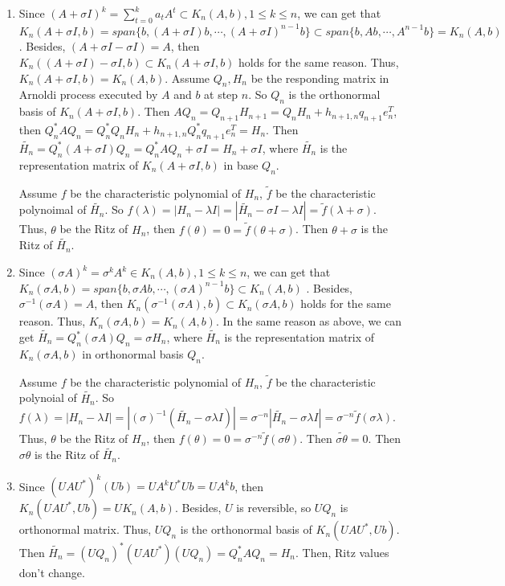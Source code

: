 \documentclass{ctexart}
\begin{document}
\begin{solution}
  \begin{enumerate}
    \item Since \((A + \sigma I)^k =\sum_{t=0}^{k} a_t A^t \subset K_n(A,b), 1 \leq k \leq n\), we can get that \(K_n(A + \sigma I,b)=span\{b,(A + \sigma I)b,\cdots,(A + \sigma I)^{n-1} b\}\subset span\{b,Ab,\cdots,A^{n -1} b\}=K_n(A,b) \).
      Besides, \((A + \sigma I - \sigma I)=A \), then \(K_n((A + \sigma I)-\sigma I, b) \subset K_n(A + \sigma I, b) \) holds for the same reason.
      Thus, \(K_n(A + \sigma I,b)=K_n(A,b) \). Assume \( Q_n, H_n\) be the responding matrix in Arnoldi process executed by \(A  \) and \(b \) at step \(n \).
      So \(Q_n \) is the orthonormal basis of \(K_n(A + \sigma I,b) \).
      Then \( AQ_n=Q_{n + 1} H_{n + 1}=Q_n H_n + h_{n + 1,n} q_{n + 1} e_n^T\), then \(Q_n^* A Q_n =Q_n^* Q_n H_n +  h_{n + 1,n}Q_n^*q_{n + 1} e_n^T=H_n\). Then \(\tilde{H_n}=Q_n^*(A + \sigma I)Q_n=Q_n^*AQ_n + \sigma I=H_n + \sigma I \), where
      \(\tilde{H_n} \) is the representation matrix of \(K_n(A + \sigma I,b) \) in base \(Q_n \).

      Assume \(f \) be the characteristic polynomial of \(H_n \), \(\tilde{f} \) be the characteristic polynoimal of \(\tilde{H_n} \).
      So \(f(\lambda)= |H_n-\lambda I|= |\tilde{H_n} -\sigma I -\lambda I|=\tilde{f}(\lambda + \sigma) \). Thus, \(\theta \) be the Ritz of \(H_n \),
      then \(f(\theta )=0=\tilde{f}(\theta + \sigma) \).
      Then \(\theta + \sigma \) is the Ritz of \(\tilde{H_n} \).
    \item Since \((\sigma A)^k =\sigma^k A^k \in K_n(A,b), 1 \leq k \leq n \), we can get that \(K_n(\sigma A,b)=span\{b,\sigma A b,\cdots,(\sigma A)^{n-1}b\} \subset K_n(A,b)\) .
      Besides, \(\sigma^{-1}(\sigma A) =A \), then \(K_n(\sigma^{-1}(\sigma A),b) \subset K_n(\sigma A,b) \) holds for the same reason.
      Thus, \(K_n(\sigma A,b)=K_n(A,b) \). In the same reason as above, we can get \(\tilde{H_n}=Q_n^*(\sigma A)Q_n=\sigma H_n \), where \(\tilde{H_n} \)
      is the representation matrix of \(K_n(\sigma A,b) \) in orthonormal basis \(Q_n \).

      Assume \(f \) be the characteristic polynomial of \(H_n \), \(\tilde{f} \) be the characteristic polynoial of \(\tilde{H_n} \).
      So \(f(\lambda)=|H_n -\lambda I|=|(\sigma)^{-1} (\tilde{H_n} -\sigma \lambda I)|=\sigma^{-n}|\tilde{H_n} -\sigma \lambda I|=\sigma^{-n}  \tilde{f}(\sigma \lambda)\).
      Thus, \(\theta \) be the Ritz of \(H_n \), then \(f(\theta)=0=\sigma^{-n}\tilde{f}(\sigma \theta)\). Then \(\tilde{\sigma \theta}=0 \).
      Then \(\sigma \theta \) is the Ritz of \(\tilde{H_n} \).
    \item Since \((UAU^*)^k(Ub)=UA^kU^*Ub=UA^kb \), then \( K_n(UAU^*,Ub)=UK_n(A,b)\). Besides, \(U \) is reversible, so \(U Q_n \) is orthonormal matrix.
      Thus, \(UQ_n \) is the orthonormal basis of \(K_n(UAU^*,Ub) \). Then \(\tilde{H_n}=(UQ_n)^*(UAU^*)(UQ_n)=Q_n^*AQ_n =H_n \).
      Then, Ritz values don't change.
  \end{enumerate}
\end{solution}
\end{document}
